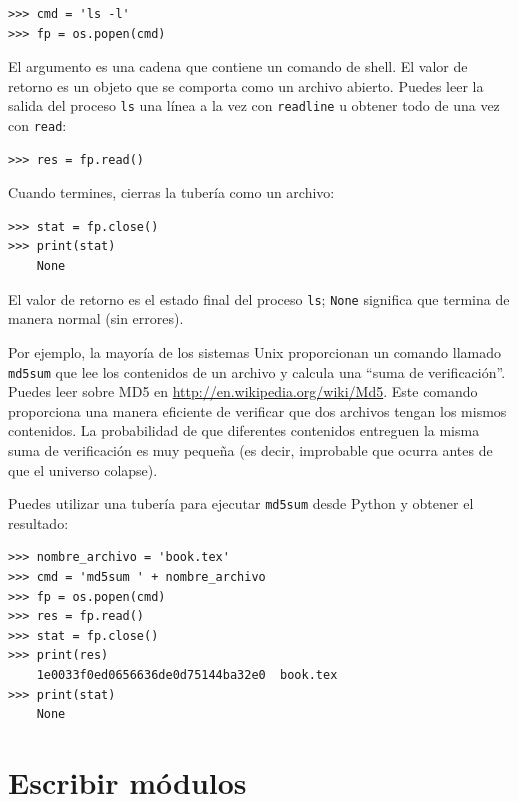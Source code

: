 \documentclass[10pt]{book}
\begin{document}
\begin{verbatim}
>>> cmd = 'ls -l'
>>> fp = os.popen(cmd)
\end{verbatim}
%
El argumento es una cadena que contiene un comando de shell.  El
valor de retorno es un objeto que se comporta como un archivo
abierto.  Puedes leer la salida del proceso {\tt ls} una
línea a la vez con {\tt readline} u obtener todo de una vez
con {\tt read}:

\begin{verbatim}
>>> res = fp.read()
\end{verbatim}
%
Cuando termines, cierras la tubería como un archivo:

\begin{verbatim}
>>> stat = fp.close()
>>> print(stat)
    None
\end{verbatim}
%
El valor de retorno es el estado final del proceso {\tt ls};
{\tt None} significa que termina de manera normal (sin errores).

Por ejemplo, la mayoría de los sistemas Unix proporcionan un comando llamado {\tt md5sum}
que lee los contenidos de un archivo y calcula una ``suma de verificación''.
Puedes leer sobre MD5 en \url{http://en.wikipedia.org/wiki/Md5}.  Este
comando proporciona una manera eficiente de verificar que dos archivos
tengan los mismos contenidos.  La probabilidad de que diferentes contenidos
entreguen la misma suma de verificación es muy pequeña (es decir, improbable que ocurra
antes de que el universo colapse).

Puedes utilizar una tubería para ejecutar {\tt md5sum} desde Python y obtener el resultado:

\begin{verbatim}
>>> nombre_archivo = 'book.tex'
>>> cmd = 'md5sum ' + nombre_archivo
>>> fp = os.popen(cmd)
>>> res = fp.read()
>>> stat = fp.close()
>>> print(res)
    1e0033f0ed0656636de0d75144ba32e0  book.tex
>>> print(stat)
    None
\end{verbatim}



\section{Escribir módulos}
\label{modules}
\end{document}
